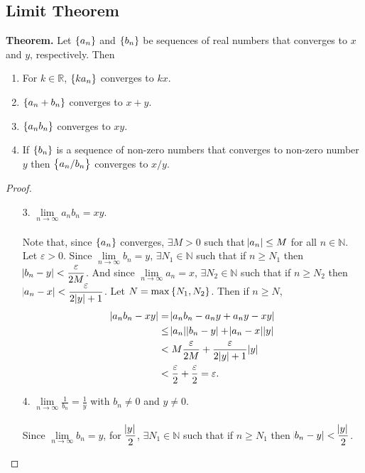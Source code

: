 \documentclass[12pt,a4paper]{article}
\newcommand{\dispsty}{\displaystyle}
\begin{document}
\subsection{Limit Theorem}
\begin{tcolorbox}[colback=white]
	\textbf{Theorem.} Let $\set{a_n}$ and $\set{b_n}$ be sequences of real numbers that converges to $x$ and $y$, respectively. Then \begin{enumerate}
		\item For $k\in\mathbb{R}$, $\set{ka_n}$ converges to $kx$.
		\item $\set{a_n+b_n}$ converges to $x+y$.
		\item $\set{a_nb_n}$ converges to $xy$.
		\item If $\set{b_n}$ is a sequence of non-zero numbers that converges to non-zero number $y$ then $\set{a_n/b_n}$ converges to $x/y$.
	\end{enumerate}\tcblower\begin{proof}
	\ \begin{itemize}
		\item[3.] $\dispsty\lim\limits_{n\to\infty}a_nb_n=xy$.\\
		\\
		Note that, since $\set{a_n}$ converges, $\exists M>0$ such that $\abs{a_n}\leq M$ for all $n\in\mathbb{N}$. \\
		Let $\varepsilon>0$. Since $\lim\limits_{n\to\infty}b_n=y$, $\exists N_1\in\mathbb{N}$ such that if $n\geq N_1$ then $\dispsty\abs{b_n-y}<\frac{\varepsilon}{2M}$. And since $\lim\limits_{n\to\infty}a_n=x$, $\exists N_2\in\mathbb{N}$ such that if $n\geq N_2$ then $\dispsty\abs{a_n-x}<\frac{\varepsilon}{2\abs{y}+1}$. Let $N=\max\set{N_1,N_2}$.
		Then if $n\geq N$, \begin{align*}
			\abs{a_nb_n-xy} &=\abs{a_nb_n-a_ny+a_ny-xy} \\
			&\leq \abs{a_n}\abs{b_n-y}+\abs{a_n-x}\abs{y} \\
			&< M\frac{\varepsilon}{2M} + \frac{\varepsilon}{2\abs{y}+1}\abs{y} \\
			&<\frac{\varepsilon}{2}+\frac{\varepsilon}{2}=\varepsilon.
		\end{align*}
		\item[4.] $\dispsty\lim\limits_{n\to\infty}\frac{1}{b_n}=\frac{1}{y}$ with $b_n\neq 0$ and $y\neq 0$.
		\\
		\\
		Since $\lim\limits_{n\to\infty}b_n=y$, for $\dispsty\frac{\abs{y}}{2}$, $\exists N_1\in\mathbb{N}$ such that if $n\geq N_1$ then $\abs{b_n-y}<\dispsty\frac{\abs{y}}{2}$.\\ 

\end{itemize}
\end{proof}
\end{tcolorbox}
\end{document}
